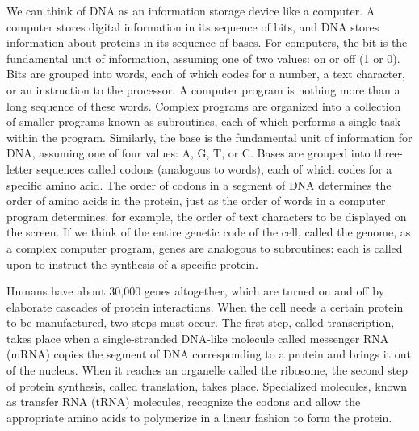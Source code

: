 We can think of DNA as an information storage device like a computer.  A computer stores digital information in its sequence of bits, and DNA stores information about proteins in its sequence of bases.  For computers, the bit is the fundamental unit of information, assuming one of two values: on or off (1 or 0).  Bits are grouped into words, each of which codes for a number, a text character, or an instruction to the processor.  A computer program is nothing more than a long sequence of these words.  Complex programs are organized into a collection of smaller programs known as subroutines, each of which performs a single task within the program.  Similarly, the base is the fundamental unit of information for DNA, assuming one of four values: A, G, T, or C.  Bases are grouped into three-letter sequences called codons (analogous to words), each of which codes for a specific amino acid.  The order of codons in a segment of DNA determines the order of amino acids in the protein, just as the order of words in a computer program determines, for example, the order of text characters to be displayed on the screen.  If we think of the entire genetic code of the cell, called the genome, as a complex computer program, genes are analogous to subroutines: each is called upon to instruct the synthesis of a specific protein.

Humans have about 30,000 genes altogether, which are turned on and off by elaborate cascades of protein interactions.  When the cell needs a certain protein to be manufactured, two steps must occur.  The first step, called transcription, takes place when a single-stranded DNA-like molecule called messenger RNA (mRNA) copies the segment of DNA corresponding to a protein and brings it out of the nucleus.  When it reaches an organelle called the ribosome, the second step of protein synthesis, called translation, takes place.  Specialized molecules, known as transfer RNA (tRNA) molecules, recognize the codons and allow the appropriate amino acids to polymerize in a linear fashion to form the protein.

